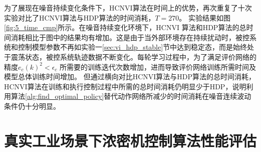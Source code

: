 为了展现在噪音持续变化条件下，HCNVI算法在时间上的优势，再次重复了十次实验对比了HCNVI算法与HDP算法的时间消耗，$T=270$。
实验结果如图\ref{fig:5_time_cmp}所示。在噪音持续变化环境下，HCNVI
算法和HDP算法的总时间消耗相比于图中的结果均有增加。这是由于当外部环境存在持续扰动时，被控系统和控制模型参数不再如实验一\ref{sec:vi_hdp_stable}节中达到稳定态，而是始终处于震荡状态，被控系统轨迹数据不断变化。每轮学习过程中，为了满足评价网络的精度$e_{c}(k)^{2}<\epsilon_{c}$
所需要的训练迭代次数增加，进而导致评价网络训练所需时间及模型总体训练时间增加。
但通过横向对比HCNVI算法与HDP算法的总时间消耗，HCNVI算法在训练和执行控制过程中所需的总时间消耗仍明显少于HDP，说明利用算法\ref{alg:find_optimal_policy}替代动作网络所减少的时间消耗在噪音连续波动条件仍十分明显。



\section{真实工业场景下浓密机控制算法性能评估}

